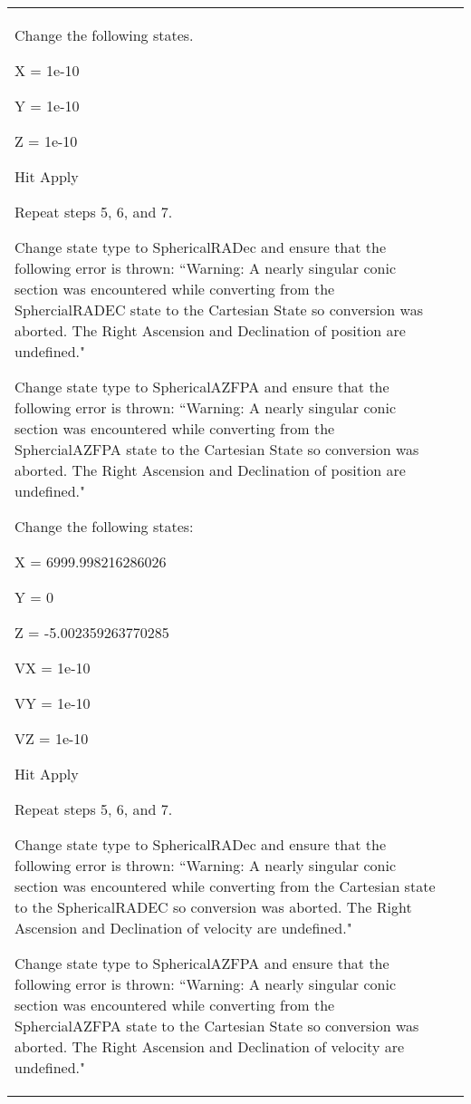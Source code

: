 \begin{table}[htbp!]
\begin{tabular}{|p{1.05 in} |p{4.75 in} |}
\begin{compactenum}
             \item Change the following states.
             \begin{compactenum}
                    \item X = 1e-10
                    \item Y = 1e-10
                    \item Z = 1e-10
             \end{compactenum}
             \item Hit Apply
             \item Repeat steps 5, 6, and 7.
             \item Change state type to SphericalRADec and ensure that the following error is thrown:  ``Warning: A nearly singular conic section was encountered while converting from the SphercialRADEC state to the Cartesian State so conversion was aborted.  The Right Ascension and Declination of position are undefined."
             \item Change state type to SphericalAZFPA and ensure that the following error is thrown: ``Warning: A nearly singular conic section was encountered while converting from the SphercialAZFPA state to the Cartesian State so conversion was aborted.  The Right Ascension and Declination of position are undefined."
             \item Change the following states:
                 \begin{compactenum}
                    \item X  = 6999.998216286026
                    \item Y = 0
                    \item Z = -5.002359263770285
                    \item VX = 1e-10
                    \item VY = 1e-10
                    \item VZ = 1e-10
                 \end{compactenum}
             \item Hit Apply
             \item Repeat steps 5, 6, and 7.
             \item Change state type to SphericalRADec and ensure that the following error is thrown:  ``Warning: A nearly singular conic section was encountered while converting from the Cartesian state to the SphericalRADEC so conversion was aborted.  The Right Ascension and Declination of velocity are undefined."
             \item Change state type to SphericalAZFPA and ensure that the following error is thrown: ``Warning: A nearly singular conic section was encountered while converting from the SphercialAZFPA state to the Cartesian State so conversion was aborted.  The Right Ascension and Declination of velocity are undefined."

\end{compactenum}
\end{tabular}
\end{table}
